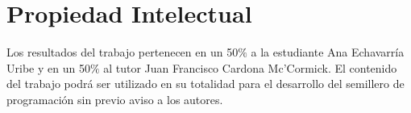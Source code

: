 \documentclass[11pt, oneside]{article}
\theoremstyle{definition}
\theoremstyle{remark}
\begin{document}
\section{Propiedad Intelectual}
Los resultados del trabajo pertenecen en un 50$\%$ a la estudiante Ana Echavarría Uribe y en un 50$\%$ al tutor Juan Francisco Cardona Mc'Cormick. El contenido del trabajo podrá ser utilizado en su totalidad para el desarrollo del semillero de programación sin previo aviso a los autores.





\end{document}
